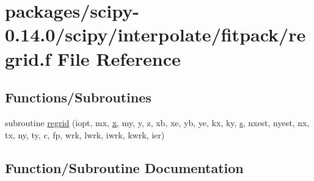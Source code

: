 \hypertarget{regrid_8f}{}\section{packages/scipy-\/0.14.0/scipy/interpolate/fitpack/regrid.f File Reference}
\label{regrid_8f}
\subsection*{Functions/\+Subroutines}
\begin{DoxyCompactItemize}
\item 
subroutine \hyperlink{regrid_8f_a0cd0ceef2ecb91c940aa417642de1ba4}{regrid} (iopt, mx, \hyperlink{vecnorm1_8cc_ac73eed9e41ec09d58f112f06c2d6cb63}{x}, my, y, z, xb, xe, yb, ye, kx, ky, \hyperlink{indexexpr_8h_ae024b0db549122b44c349ae28ec990dc}{s}, nxest, nyest, nx, tx, ny, ty, c, fp, wrk, lwrk, iwrk, kwrk, ier)
\end{DoxyCompactItemize}


\subsection{Function/\+Subroutine Documentation}
\hypertarget{regrid_8f_a0cd0ceef2ecb91c940aa417642de1ba4}{}
